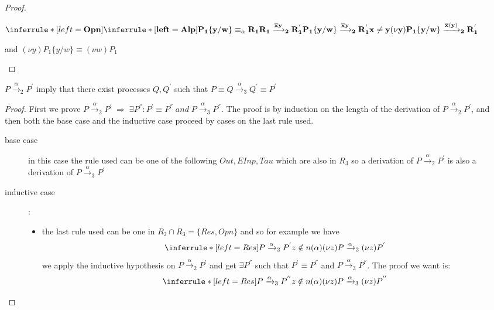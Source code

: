 \begin{lemma}
\begin{proof}
\begin{description}
	\begin{center}
	  $\inferrule* [left=\bf{Opn}]{
	      \inferrule* [left=\bf{Alp}]{
		  P_{1}\{y/w\} \equiv_{\alpha} R_{1}
		\\
		  R_{1} \xrightarrow{\overline{x}y}_{2} R_{1}^{'}
	      }{
		P_{1}\{y/w\} \xrightarrow{\overline{x}y}_{2} R_{1}^{'}
	      }
	    \\
	      x\neq y
	  }{
	    (\nu y)P_{1}\{y/w\} \xrightarrow{\overline{x}(y)}_{2} R_{1}^{'}
	  }$
	\end{center}
	and $(\nu y)P_{1}\{y/w\} \equiv (\nu w)P_{1}$
    \end{description}
  \end{proof}
\end{lemma}


\begin{lemma}
  $P\xrightarrow{\alpha}_{2} P^{'}$ imply that there exist processes $Q, Q^{'}$ such that  $P \equiv Q \xrightarrow{\alpha}_{3} Q^{'} \equiv P^{'}$
  \begin{proof}
	First we prove $P\xrightarrow{\alpha}_{2}P^{'}\; \Rightarrow\; \exists P^{''}: P^{'}\equiv P^{''}\; and\; P\xrightarrow{\alpha}_{3}P^{''}$. The proof is by induction on the length of the derivation of $P\xrightarrow{\alpha}_{2}P^{'}$, and then both the base case and the inductive case proceed by cases on the last rule used.
	\begin{description}
	  \item[base case]
	    in this case the rule used can be one of the following $Out, EInp, Tau$ which are also in $R_{3}$ so a derivation of $P\xrightarrow{\alpha}_{2}P^{'}$ is also a derivation of $P\xrightarrow{\alpha}_{3}P^{'}$
	  \item[inductive case]:
	    \begin{itemize}
	      \item 
		the last rule used can be one in $R_{2}\cap R_{3}=\{Res, Opn\}$ and so for example we have 
		\[
		  \inferrule* [left=Res]{
		      P\xrightarrow{\alpha}_{2} P^{'}
		    \\
		      z\notin n(\alpha)
		  }{
		    (\nu z) P\xrightarrow{\alpha}_{2}(\nu z) P^{'}
		  }
		\]
		we apply the inductive hypothesis on $P\xrightarrow{\alpha}_{2} P^{'}$ and get $\exists P^{''}$ such that $P^{'}\equiv P^{''}$ and $P\xrightarrow{\alpha}_{3} P^{''}$. The proof we want is:
		\[
		  \inferrule* [left=Res]{
		      P\xrightarrow{\alpha}_{3} P^{''}
		    \\
		      z\notin n(\alpha)
		  }{
		    (\nu z) P\xrightarrow{\alpha}_{3}(\nu z) P^{''}
}\]
\end{itemize}
\end{description}
\end{proof}
\end{lemma}
